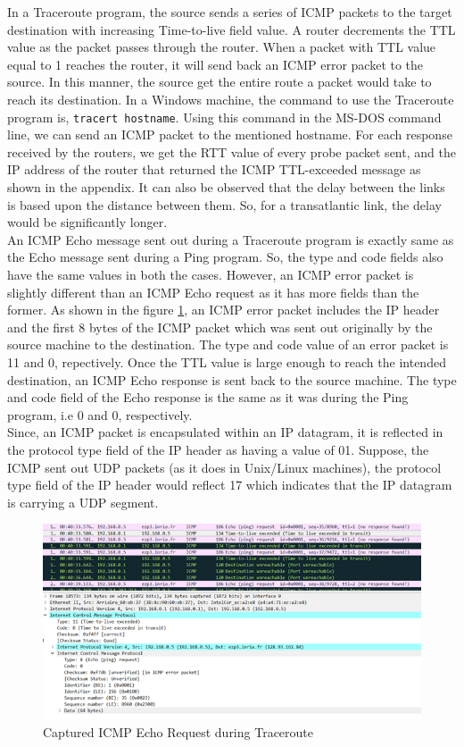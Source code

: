 \documentclass[10pt]{IEEEtran}
\begin{document}
 In a Traceroute program, the source sends a series of ICMP packets to the target destination with increasing Time-to-live field value. A router decrements the TTL value as the packet passes through the router. When a packet with TTL value equal to 1 reaches the router, it will send back an ICMP error packet to the source. In this manner, the source get the entire route a packet would take to reach its destination. In a Windows machine, the command to use the Traceroute program is, {\tt tracert hostname}. Using this command in the MS-DOS command line, we can send an ICMP packet to the mentioned hostname. For each response received by the routers, we get the RTT value of every probe packet sent, and the IP address of the router that returned the ICMP TTL-exceeded message as shown in the appendix. It can also be observed that the delay between the links is based upon the distance between them. So, for a transatlantic link, the delay would be significantly longer. \\
 
 An ICMP Echo message sent out during a Traceroute program is exactly same as the Echo message sent during a Ping program. So, the type and code fields also have the same values in both the cases. However, an ICMP error packet is slightly different than an ICMP Echo request as it has more fields than the former. As shown in the figure \ref{fig:traceError}, an ICMP error packet includes the IP header and the first 8 bytes of the ICMP packet which was sent out originally by the source machine to the destination. The type and code value of an error packet is 11 and 0, repectively. Once the TTL value is large enough to reach the intended destination, an ICMP Echo response is sent back to the source machine. The type and code field of the Echo response is the same as it was during the Ping program, i.e 0 and 0, respectively.\\
 Since, an ICMP packet is encapsulated within an IP datagram, it is reflected in the protocol type field of the IP header as having a value of 01. Suppose, the ICMP sent out UDP packets (as it does in Unix/Linux machines), the protocol type field of the IP header would reflect 17 which indicates that the IP datagram is carrying a UDP segment.\\

\begin{figure}[h!]
	\includegraphics[width=\linewidth]{traceError.png}
	\caption{Captured ICMP Echo Request during Traceroute}
	\label{fig:traceError}
\end{figure}
\end{document}
